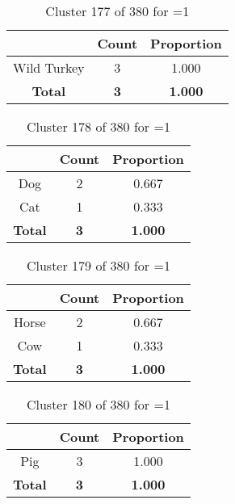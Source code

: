 \begin{table}[ht!]
\centering
\begin{tabular}{|c|c|c|}
\hline
\bf \Spec{} &\bf Count &\bf Proportion\\ \hline \hline
Wild Turkey & 3 & 1.000\\ \hline
\hline
\bf Total & \bf 3 & \bf 1.000\\ \hline
\end{tabular}
\label{tab:cluster:177:1}
\caption{Cluster 177 of 380 for \minneigh{}=1}
\end{table}

\begin{table}[ht!]
\centering
\begin{tabular}{|c|c|c|}
\hline
\bf \Spec{} &\bf Count &\bf Proportion\\ \hline \hline
Dog & 2 & 0.667\\ \hline
Cat & 1 & 0.333\\ \hline
\hline
\bf Total & \bf 3 & \bf 1.000\\ \hline
\end{tabular}
\label{tab:cluster:178:1}
\caption{Cluster 178 of 380 for \minneigh{}=1}
\end{table}

\begin{table}[ht!]
\centering
\begin{tabular}{|c|c|c|}
\hline
\bf \Spec{} &\bf Count &\bf Proportion\\ \hline \hline
Horse & 2 & 0.667\\ \hline
Cow & 1 & 0.333\\ \hline
\hline
\bf Total & \bf 3 & \bf 1.000\\ \hline
\end{tabular}
\label{tab:cluster:179:1}
\caption{Cluster 179 of 380 for \minneigh{}=1}
\end{table}

\clearpage
\begin{table}[ht!]
\centering
\begin{tabular}{|c|c|c|}
\hline
\bf \Spec{} &\bf Count &\bf Proportion\\ \hline \hline
Pig & 3 & 1.000\\ \hline
\hline
\bf Total & \bf 3 & \bf 1.000\\ \hline
\end{tabular}
\label{tab:cluster:180:1}
\caption{Cluster 180 of 380 for \minneigh{}=1}
\end{table}

